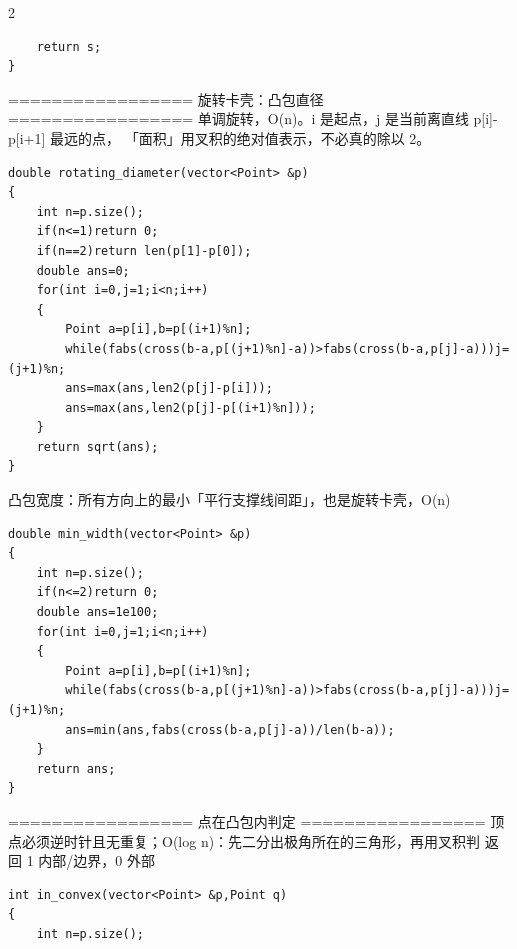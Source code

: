 \documentclass[UTF8,fontset=fandol,a4paper,twoside]{ctexart}
\newcommand{\note}[1]{{\fontsize{10}{12}\selectfont #1\par}}
\begin{document}
\begin{multicols}{2}
\begin{lstlisting}
    return s;
}
\end{lstlisting}
\note{=\allowbreak{}=\allowbreak{}=\allowbreak{}=\allowbreak{}=\allowbreak{}=\allowbreak{}=\allowbreak{}=\allowbreak{}=\allowbreak{}=\allowbreak{}=\allowbreak{}=\allowbreak{}=\allowbreak{}=\allowbreak{}=\allowbreak{}=\allowbreak{}=\allowbreak{} 旋转卡壳：凸包直径 =\allowbreak{}=\allowbreak{}=\allowbreak{}=\allowbreak{}=\allowbreak{}=\allowbreak{}=\allowbreak{}=\allowbreak{}=\allowbreak{}=\allowbreak{}=\allowbreak{}=\allowbreak{}=\allowbreak{}=\allowbreak{}=\allowbreak{}=\allowbreak{}=\allowbreak{} 单调旋转，O(\allowbreak{}n)\allowbreak{}。i 是起点，j 是当前离直线 p[\allowbreak{}i]\allowbreak{}-\allowbreak{}p[\allowbreak{}i+\allowbreak{}1]\allowbreak{} 最远的点， 「面积」用叉积的绝对值表示，不必真的除以 2。}
\begin{lstlisting}
double rotating_diameter(vector<Point> &p)
{
    int n=p.size();
    if(n<=1)return 0;
    if(n==2)return len(p[1]-p[0]);
    double ans=0;
    for(int i=0,j=1;i<n;i++)
    {
        Point a=p[i],b=p[(i+1)%n];
        while(fabs(cross(b-a,p[(j+1)%n]-a))>fabs(cross(b-a,p[j]-a)))j=(j+1)%n;
        ans=max(ans,len2(p[j]-p[i]));
        ans=max(ans,len2(p[j]-p[(i+1)%n]));
    }
    return sqrt(ans);
}
\end{lstlisting}
\note{凸包宽度：所有方向上的最小「平行支撑线间距」，也是旋转卡壳，O(\allowbreak{}n)\allowbreak{}}
\begin{lstlisting}
double min_width(vector<Point> &p)
{
    int n=p.size();
    if(n<=2)return 0;
    double ans=1e100;
    for(int i=0,j=1;i<n;i++)
    {
        Point a=p[i],b=p[(i+1)%n];
        while(fabs(cross(b-a,p[(j+1)%n]-a))>fabs(cross(b-a,p[j]-a)))j=(j+1)%n;
        ans=min(ans,fabs(cross(b-a,p[j]-a))/len(b-a));
    }
    return ans;
}
\end{lstlisting}
\note{=\allowbreak{}=\allowbreak{}=\allowbreak{}=\allowbreak{}=\allowbreak{}=\allowbreak{}=\allowbreak{}=\allowbreak{}=\allowbreak{}=\allowbreak{}=\allowbreak{}=\allowbreak{}=\allowbreak{}=\allowbreak{}=\allowbreak{}=\allowbreak{}=\allowbreak{} 点在凸包内判定 =\allowbreak{}=\allowbreak{}=\allowbreak{}=\allowbreak{}=\allowbreak{}=\allowbreak{}=\allowbreak{}=\allowbreak{}=\allowbreak{}=\allowbreak{}=\allowbreak{}=\allowbreak{}=\allowbreak{}=\allowbreak{}=\allowbreak{}=\allowbreak{}=\allowbreak{} 顶点必须逆时针且无重复；O(\allowbreak{}log n)\allowbreak{}：先二分出极角所在的三角形，再用叉积判 返回 1 内部/\allowbreak{}边界，0 外部}
\begin{lstlisting}
int in_convex(vector<Point> &p,Point q)
{
    int n=p.size();

\end{lstlisting}
\end{multicols}
\end{document}
